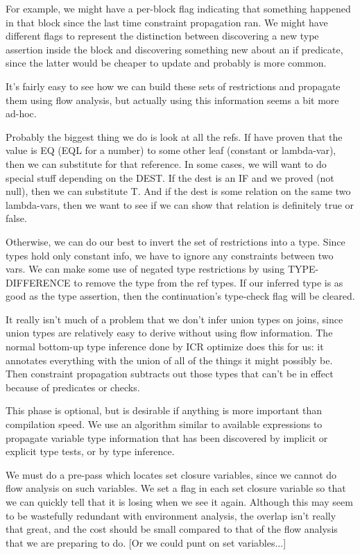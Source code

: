 For example, we might have a per-block flag indicating that something happened
in that block since the last time constraint propagation ran.  We might have
different flags to represent the distinction between discovering a new type
assertion inside the block and discovering something new about an if
predicate, since the latter would be cheaper to update and probably is more
common.

It's fairly easy to see how we can build these sets of restrictions and
propagate them using flow analysis, but actually using this information seems
a bit more ad-hoc.  

Probably the biggest thing we do is look at all the refs.  If have proven that
the value is EQ (EQL for a number) to some other leaf (constant or lambda-var),
then we can substitute for that reference.  In some cases, we will want to do
special stuff depending on the DEST.  If the dest is an IF and we proved (not
null), then we can substitute T.  And if the dest is some relation on the same
two lambda-vars, then we want to see if we can show that relation is definitely
true or false.

Otherwise, we can do our best to invert the set of restrictions into a type.
Since types hold only constant info, we have to ignore any constraints between
two vars.  We can make some use of negated type restrictions by using
TYPE-DIFFERENCE to remove the type from the ref types.  If our inferred type is
as good as the type assertion, then the continuation's type-check flag will be
cleared.

It really isn't much of a problem that we don't infer union types on joins,
since union types are relatively easy to derive without using flow information.
The normal bottom-up type inference done by ICR optimize does this for us: it
annotates everything with the union of all of the things it might possibly be.
Then constraint propagation subtracts out those types that can't be in effect
because of predicates or checks.



This phase is optional, but is desirable if anything is more important than
compilation speed.  We use an algorithm similar to available expressions to
propagate variable type information that has been discovered by implicit or
explicit type tests, or by type inference.

We must do a pre-pass which locates set closure variables, since we cannot do
flow analysis on such variables.  We set a flag in each set closure variable so
that we can quickly tell that it is losing when we see it again.  Although this
may seem to be wastefully redundant with environment analysis, the overlap
isn't really that great, and the cost should be small compared to that of the
flow analysis that we are preparing to do.  [Or we could punt on set
variables...]

